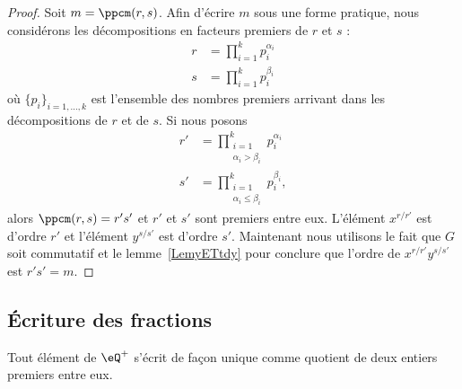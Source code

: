 \begin{proof}
	Soit \( m=\ppcm(r,s)\). Afin d'écrire \( m\) sous une forme pratique, nous considérons les décompositions en facteurs premiers de \( r\) et \( s\) :
	\begin{subequations}
		\begin{align}
			r & =\prod_{i=1}^kp_i^{\alpha_i} \\
			s & =\prod_{i=1}^kp_i^{\beta_i}
		\end{align}
	\end{subequations}
	où \( \{ p_i \}_{i=1,\ldots, k}\) est l'ensemble des nombres premiers arrivant dans les décompositions de \( r\) et de \( s\). Si nous posons
	\begin{subequations}
		\begin{align}
			r' & =\prod_{\substack{i=1 \\\alpha_i>\beta_i}}^kp_i^{\alpha_i}      \\
			s' & =\prod_{\substack{i=1 \\\alpha_i\leq \beta_i}}^kp_i^{\beta_i},
		\end{align}
	\end{subequations}
	alors \( \ppcm(r,s)=r's'\) et \( r'\) et \( s'\) sont premiers entre eux. L'élément \( x^{r/r'}\) est d'ordre \( r'\) et l'élément \( y^{s/s'}\) est d'ordre \( s'\). Maintenant nous utilisons le fait que \( G\) soit commutatif et le lemme~\ref{LemyETtdy} pour conclure que l'ordre de \( x^{r/r'}y^{s/s'}\) est \( r's'=m\).
\end{proof}


\subsection{Écriture des fractions}

\begin{theorem}     \label{THOooWYQVooRBaAAM}
	Tout élément de \( \eQ^+\) s'écrit de façon unique comme quotient de deux entiers premiers entre eux.
\end{theorem}

